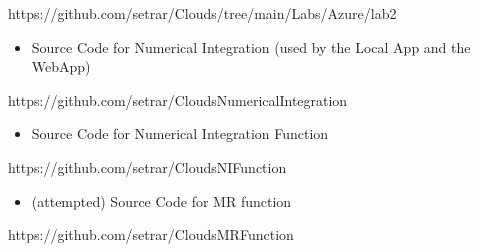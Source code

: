 \documentclass[11pt]{article}
\makeatletter
\providecommand{\tightlist}{%
      \setlength{\itemsep}{0pt}\setlength{\parskip}{0pt}}
\newcommand{\boxspacing}{\kern\kvtcb@left@rule\kern\kvtcb@boxsep}
\newcommand{\prompt}[4]{
        {\ttfamily\llap{{\color{#2}[#3]:\hspace{3pt}#4}}\vspace{-\baselineskip}}
    }
\makeatother
\begin{document}
https://github.com/setrar/Clouds/tree/main/Labs/Azure/lab2

\begin{itemize}
\tightlist
\item
  Source Code for Numerical Integration (used by the Local App and the
  WebApp)
\end{itemize}

https://github.com/setrar/CloudsNumericalIntegration

\begin{itemize}
\tightlist
\item
  Source Code for Numerical Integration Function
\end{itemize}

https://github.com/setrar/CloudsNIFunction

\begin{itemize}
\tightlist
\item
  (attempted) Source Code for MR function
\end{itemize}

https://github.com/setrar/CloudsMRFunction

    \begin{tcolorbox}[breakable, size=fbox, boxrule=1pt, pad at break*=1mm,colback=cellbackground, colframe=cellborder]
\prompt{In}{incolor}{ }{\boxspacing}
\begin{Verbatim}[commandchars=\\\{\}]

\end{Verbatim}
\end{tcolorbox}


    
    
    
\end{document}
